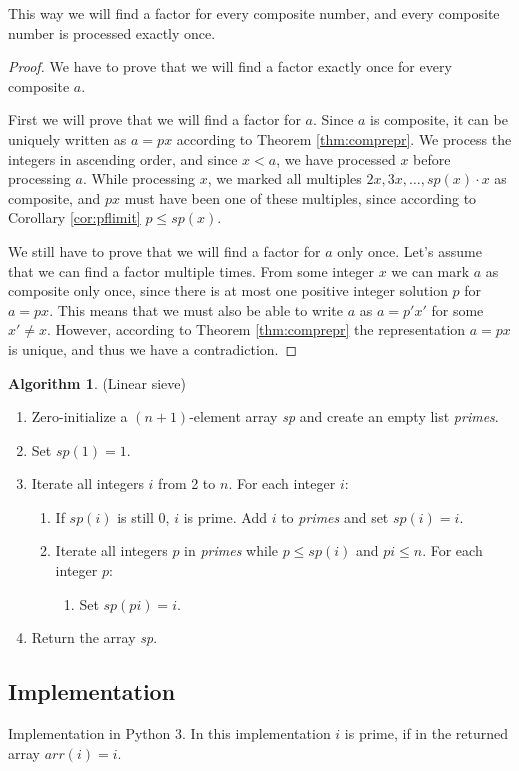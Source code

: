 \documentclass[12pt] {article}
\theoremstyle{plain}
\theoremstyle{definition}
\newtheorem{algo}[thm]{Algorithm}
\begin{document}
This way we will find a factor for every composite number, and every composite number is processed exactly once.

\begin{proof}
We have to prove that we will find a factor exactly once for every composite $a$.

First we will prove that we will find a factor for $a$. Since $a$ is composite, it can be uniquely written as $a = px$ according to Theorem \ref{thm:comprepr}. We process the integers in ascending order, and since $x < a$, we have processed $x$ before processing $a$. While processing $x$, we marked all multiples $2x, 3x, \dots, sp(x) \cdot x$ as composite, and $px$ must have been one of these multiples, since according to Corollary \ref{cor:pflimit} $p \leq sp(x)$.

We still have to prove that we will find a factor for $a$ only once. Let's assume that we can find a factor multiple times. From some integer $x$ we can mark $a$ as composite only once, since there is at most one positive integer solution $p$ for $a = px$. This means that we must also be able to write $a$ as $a = p'x'$ for some $x' \neq x$. However, according to Theorem \ref{thm:comprepr} the representation $a = px$ is unique, and thus we have a contradiction.
\end{proof}

\begin{algo} (Linear sieve)
\begin{enumerate}
\item Zero-initialize a $(n+1)$-element array \textit{sp} and create an empty list \textit{primes}.
\item Set $sp(1) = 1$.
\item Iterate all integers $i$ from 2 to $n$. For each integer $i$:
\begin{enumerate}
	\item If $sp(i)$ is still 0, $i$ is prime. Add $i$ to \textit{primes} and set $sp(i) = i$.
	\item Iterate all integers $p$ in \textit{primes} while $p \leq sp(i)$ and $pi \leq n$. For each integer $p$:
\begin{enumerate}
		\item Set $sp(pi) = i$.
\end{enumerate}
\end{enumerate}
\item Return the array \textit{sp}.
\end{enumerate}
\end{algo}

\subsection {Implementation}

Implementation in Python 3. In this implementation $i$ is prime, if in the returned array $arr(i) = i$.



\printbibliography
\end{document}

